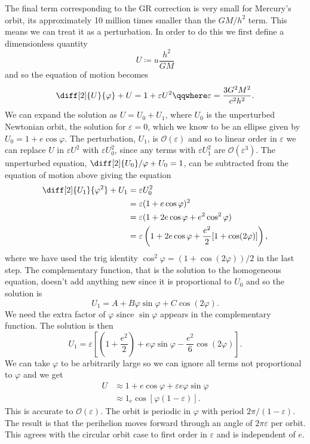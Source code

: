 \documentclass[fleqn]{NotesClass}
\newcommand*{\order}{\mathcal{O}}
\begin{document}
    The final term corresponding to the GR correction is very small for Mercury's orbit, its approximately 10 million times smaller than the \(GM/h^2\) term.
    This means we can treat it as a perturbation.
    In order to do this we first define a dimensionless quantity
    \begin{equation}
        U \coloneqq u\frac{h^2}{GM}
    \end{equation}
    and so the equation of motion becomes
    \begin{equation}
        \diff[2]{U}{\varphi} + U = 1 + \varepsilon U^2 \qqwhere \varepsilon = \frac{3G^2M^2}{c^2h^2}.
    \end{equation}
    We can expand the solution as \(U = U_0 + U_1\), where \(U_0\) is the unperturbed Newtonian orbit, the solution for \(\varepsilon = 0\), which we know to be an ellipse given by \(U_0 = 1 + e\cos\varphi\).
    The perturbation, \(U_1\), is \(\order(\varepsilon)\) and so to linear order in \(\varepsilon\) we can replace \(U\) in \(\varepsilon U^2\) with \(\varepsilon U_0^2\), since any terms with \(\varepsilon U_1^2\) are \(\order(\varepsilon^3)\).
    The unperturbed equation, \(\diff[2]{U_0}/{\varphi} + U_0 = 1\), can be subtracted from the equation of motion above giving the equation
    \begin{align}
        \diff[2]{U_1}{\varphi^2} + U_1 &= \varepsilon U_0^2\\
        &= \varepsilon(1 + e\cos\varphi)^2\\
        &= \varepsilon(1 + 2e\cos\varphi + e^2\cos^2\varphi)\\
        &= \varepsilon\left( 1 + 2e\cos\varphi + \frac{e^2}{2}[1 + \cos(2\varphi)] \right),
    \end{align}
    where we have used the trig identity \(\cos^2\varphi = (1 + \cos(2\varphi))/2\) in the last step.
    The complementary function, that is the solution to the homogeneous equation, doesn't add anything new since it is proportional to \(U_0\) and so the solution is
    \begin{equation}
        U_1 = A + B\varphi \sin\varphi + C\cos(2\varphi).
    \end{equation}
    We need the extra factor of \(\varphi\) since \(\sin\varphi\) appears in the complementary function.
    The solution is then
    \begin{equation}
        U_1 = \varepsilon\left[ \left( 1 + \frac{e^2}{2} \right) + e\varphi\sin\varphi - \frac{e^2}{6}\cos(2\varphi) \right].
    \end{equation}
    We can take \(\varphi\) to be arbitrarily large so we can ignore all terms not proportional to \(\varphi\) and we get
    \begin{align}
        U &\approx 1 + e\cos\varphi + \varepsilon e \varphi \sin \varphi\\
        &\approx 1 _ e \cos[\varphi(1 - \varepsilon)].
    \end{align}
    This is accurate to \(\order(\varepsilon)\).
    The orbit is periodic in \(\varphi\) with period \(2\pi/(1 - \varepsilon)\).
    The result is that the perihelion moves forward through an angle of \(2\pi\varepsilon\) per orbit.
    This agrees with the circular orbit case to first order in \(\varepsilon\) and is independent of \(e\).
    
\end{document}
